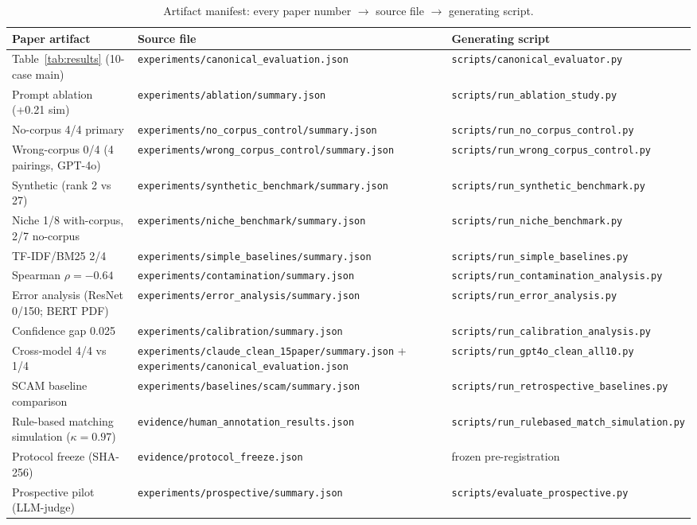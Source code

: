 \documentclass[11pt]{article}
\newcommand{\fpath}[1]{\mbox{}\nolinkurl{#1}}
\begin{document}
\begin{table}[t]
\centering
\caption{Artifact manifest: every paper number $\rightarrow$ source file $\rightarrow$ generating script.}
\label{tab:manifest}
\footnotesize
\setlength{\tabcolsep}{4pt}
\renewcommand{\arraystretch}{1.0}
\begin{tabular}{@{}>{\raggedright\arraybackslash}p{}>{\raggedright\arraybackslash}p{}>{\raggedright\arraybackslash}p{}@{}}
\toprule
Paper artifact & Source file & Generating script \\
\midrule
Table~\ref{tab:results} (10-case main) & \fpath{experiments/canonical_evaluation.json} & \fpath{scripts/canonical_evaluator.py} \\
Prompt ablation (+0.21 sim) & \fpath{experiments/ablation/summary.json} & \fpath{scripts/run_ablation_study.py} \\
No-corpus 4/4 primary & \fpath{experiments/no_corpus_control/summary.json} & \fpath{scripts/run_no_corpus_control.py} \\
Wrong-corpus 0/4 (4 pairings, GPT-4o) & \fpath{experiments/wrong_corpus_control/summary.json} & \fpath{scripts/run_wrong_corpus_control.py} \\
Synthetic (rank 2 vs 27) & \fpath{experiments/synthetic_benchmark/summary.json} & \fpath{scripts/run_synthetic_benchmark.py} \\
Niche 1/8 with-corpus, 2/7 no-corpus & \fpath{experiments/niche_benchmark/summary.json} & \fpath{scripts/run_niche_benchmark.py} \\
TF-IDF/BM25 2/4 & \fpath{experiments/simple_baselines/summary.json} & \fpath{scripts/run_simple_baselines.py} \\
Spearman $\rho = -0.64$ & \fpath{experiments/contamination/summary.json} & \fpath{scripts/run_contamination_analysis.py} \\
Error analysis (ResNet 0/150; BERT PDF) & \fpath{experiments/error_analysis/summary.json} & \fpath{scripts/run_error_analysis.py} \\
Confidence gap 0.025 & \fpath{experiments/calibration/summary.json} & \fpath{scripts/run_calibration_analysis.py} \\
Cross-model 4/4 vs 1/4 & \fpath{experiments/claude_clean_15paper/summary.json} + \fpath{experiments/canonical_evaluation.json} & \fpath{scripts/run_gpt4o_clean_all10.py} \\
SCAM baseline comparison & \fpath{experiments/baselines/scam/summary.json} & \fpath{scripts/run_retrospective_baselines.py} \\
Rule-based matching simulation ($\kappa = 0.97$) & \fpath{evidence/human_annotation_results.json} & \fpath{scripts/run_rulebased_match_simulation.py} \\
Protocol freeze (SHA-256) & \fpath{evidence/protocol_freeze.json} & frozen pre-registration \\
Prospective pilot (LLM-judge) & \fpath{experiments/prospective/summary.json} & \fpath{scripts/evaluate_prospective.py} \\
\bottomrule
\end{tabular}
\end{table}
\end{document}
